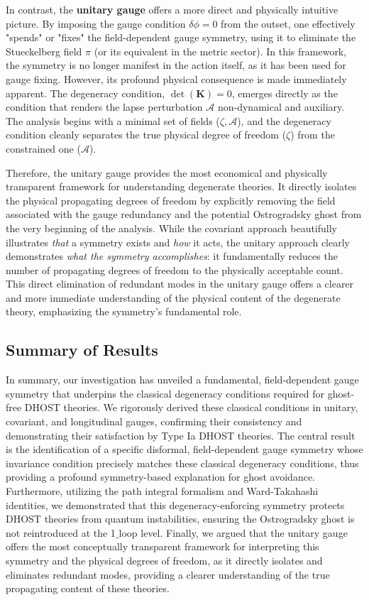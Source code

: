 \documentclass[twocolumn]{aastex631}
\begin{document}
In contrast, the \textbf{unitary gauge} offers a more direct and physically intuitive picture. By imposing the gauge condition $\delta\phi=0$ from the outset, one effectively "spends" or "fixes" the field-dependent gauge symmetry, using it to eliminate the Stueckelberg field $\pi$ (or its equivalent in the metric sector). In this framework, the symmetry is no longer manifest in the action itself, as it has been used for gauge fixing. However, its profound physical consequence is made immediately apparent. The degeneracy condition, $\det(\mathbf{K})=0$, emerges directly as the condition that renders the lapse perturbation $\mathcal{A}$ non-dynamical and auxiliary. The analysis begins with a minimal set of fields ($\zeta, \mathcal{A}$), and the degeneracy condition cleanly separates the true physical degree of freedom ($\zeta$) from the constrained one ($\mathcal{A}$).

Therefore, the unitary gauge provides the most economical and physically transparent framework for understanding degenerate theories. It directly isolates the physical propagating degrees of freedom by explicitly removing the field associated with the gauge redundancy and the potential Ostrogradsky ghost from the very beginning of the analysis. While the covariant approach beautifully illustrates \textit{that} a symmetry exists and \textit{how} it acts, the unitary approach clearly demonstrates \textit{what the symmetry accomplishes}: it fundamentally reduces the number of propagating degrees of freedom to the physically acceptable count. This direct elimination of redundant modes in the unitary gauge offers a clearer and more immediate understanding of the physical content of the degenerate theory, emphasizing the symmetry's fundamental role.

\subsection{Summary of Results}
In summary, our investigation has unveiled a fundamental, field-dependent gauge symmetry that underpins the classical degeneracy conditions required for ghost-free DHOST theories. We rigorously derived these classical conditions in unitary, covariant, and longitudinal gauges, confirming their consistency and demonstrating their satisfaction by Type Ia DHOST theories. The central result is the identification of a specific disformal, field-dependent gauge symmetry whose invariance condition precisely matches these classical degeneracy conditions, thus providing a profound symmetry-based explanation for ghost avoidance. Furthermore, utilizing the path integral formalism and Ward-Takahashi identities, we demonstrated that this degeneracy-enforcing symmetry protects DHOST theories from quantum instabilities, ensuring the Ostrogradsky ghost is not reintroduced at the 1\ensuremath{\_}loop level. Finally, we argued that the unitary gauge offers the most conceptually transparent framework for interpreting this symmetry and the physical degrees of freedom, as it directly isolates and eliminates redundant modes, providing a clearer understanding of the true propagating content of these theories.
\end{document}
